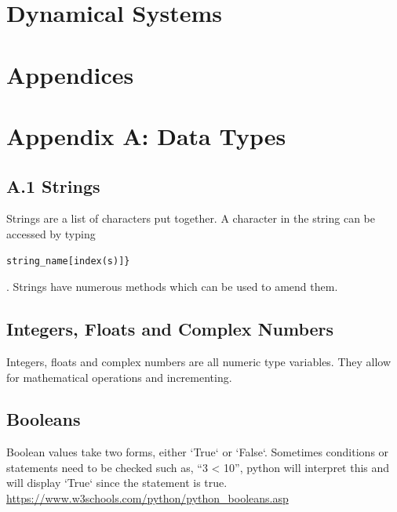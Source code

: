 \documentclass[11pt]{article}
\begin{document}
\section{Dynamical Systems}
\section{Appendices}
\appendix
\section{Appendix A: Data Types}
\subsection*{A.1 Strings}
Strings are a list of characters put together. A character in the string can be accessed by typing 
\begin{verbatim}
string_name[index(s)]}
\end{verbatim}. 
Strings have numerous methods which can be used to amend them. 

\subsection{Integers, Floats and Complex Numbers}
Integers, floats and complex numbers are all numeric type variables. They allow for mathematical operations and incrementing. 

\subsection{Booleans}
Boolean values take two forms, either `True` or `False`. Sometimes conditions or statements need to be checked such as, “3 < 10”, python will interpret this and will display `True` since the statement is true.\\
\href{https://www.w3schools.com/python/python_booleans.asp}{https://www.w3schools.com/python/python_booleans.asp}
\end{document}
